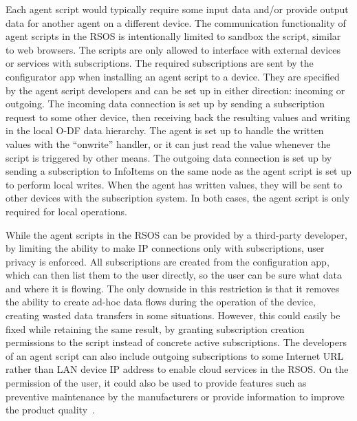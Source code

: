 Each agent script would typically require some input data and/or provide output data for another agent on a different device. The communication functionality of agent scripts in the RSOS is intentionally limited to sandbox the script, similar to web browsers. The scripts are only allowed to interface with external devices or services with subscriptions. The required subscriptions are sent by the configurator app when installing an agent script to a device. They are specified by the agent script developers and can be set up in either direction: incoming or outgoing. The incoming data connection is set up by sending a subscription request to some other device, then receiving back the resulting values and writing in the local O-DF data hierarchy. The agent is set up to handle the written values with the ``onwrite'' handler, or it can just read the value whenever the script is triggered by other means. The outgoing data connection is set up by sending a subscription to InfoItems on the same node as the agent script is set up to perform local writes. When the agent has written values, they will be sent to other devices with the subscription system. In both cases, the agent script is only required for local operations.

While the agent scripts in the RSOS can be provided by a third-party developer, by limiting the ability to make IP connections only with subscriptions, user privacy is enforced. All subscriptions are created from the configuration app, which can then list them to the user directly, so the user can be sure what data and where it is flowing. The only downside in this restriction is that it removes the ability to create ad-hoc data flows during the operation of the device, creating wasted data transfers in some situations. However, this could easily be fixed while retaining the same result, by granting subscription creation permissions to the script instead of concrete active subscriptions. The developers of an agent script can also include outgoing subscriptions to some Internet URL rather than LAN device IP address to enable cloud services in the RSOS. On the permission of the user, it could also be used to provide features such as preventive maintenance by the manufacturers or provide information to improve the product quality~\cite{Gathering_Product_Data_from_Smart_Products}.

